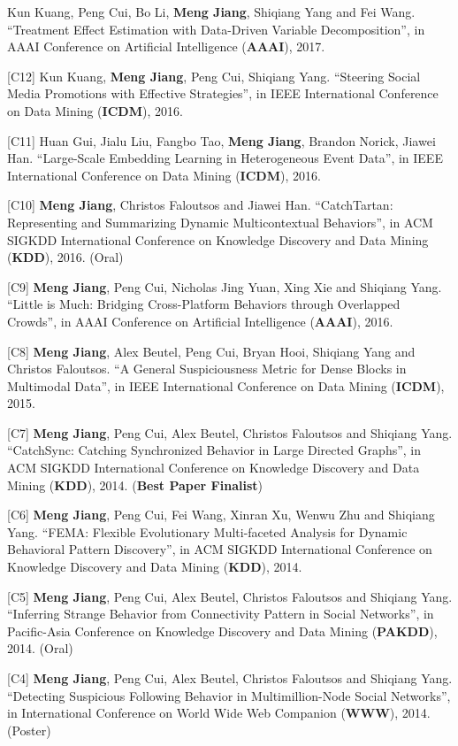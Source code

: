 \documentclass[margin, 9pt]{res}
\begin{document}
\begin{resume}
[C13] Kun Kuang, Peng Cui, Bo Li, \textbf{Meng Jiang}, Shiqiang Yang and Fei Wang. ``Treatment Effect Estimation with Data-Driven Variable Decomposition'', in AAAI Conference on Artificial Intelligence (\textbf{AAAI}), 2017.

[C12] Kun Kuang, \textbf{Meng Jiang}, Peng Cui, Shiqiang Yang. ``Steering Social Media Promotions with Effective Strategies'', in IEEE International Conference on Data Mining (\textbf{ICDM}), 2016.

[C11] Huan Gui, Jialu Liu, Fangbo Tao, \textbf{Meng Jiang}, Brandon Norick, Jiawei Han. ``Large-Scale Embedding Learning in Heterogeneous Event Data'', in IEEE International Conference on Data Mining (\textbf{ICDM}), 2016.

[C10] \textbf{Meng Jiang}, Christos Faloutsos and Jiawei Han. ``CatchTartan: Representing and Summarizing Dynamic Multicontextual Behaviors'', in ACM SIGKDD International Conference on Knowledge Discovery and Data Mining (\textbf{KDD}), 2016. (Oral)

[C9] \textbf{Meng Jiang}, Peng Cui, Nicholas Jing Yuan, Xing Xie and Shiqiang Yang. ``Little is Much: Bridging Cross-Platform Behaviors through Overlapped Crowds'', in AAAI Conference on Artificial Intelligence (\textbf{AAAI}), 2016.

[C8] \textbf{Meng Jiang}, Alex Beutel, Peng Cui, Bryan Hooi, Shiqiang Yang and Christos Faloutsos. ``A General Suspiciousness Metric for Dense Blocks in Multimodal Data'', in IEEE International Conference on Data Mining (\textbf{ICDM}), 2015.

[C7] \textbf{Meng Jiang}, Peng Cui, Alex Beutel, Christos Faloutsos and Shiqiang Yang. ``CatchSync: Catching Synchronized Behavior in Large Directed Graphs'', in ACM SIGKDD International Conference on Knowledge Discovery and Data Mining (\textbf{KDD}), 2014. (\textbf{Best Paper Finalist})

[C6] \textbf{Meng Jiang}, Peng Cui, Fei Wang, Xinran Xu, Wenwu Zhu and Shiqiang Yang. ``FEMA: Flexible Evolutionary Multi-faceted Analysis for Dynamic Behavioral Pattern Discovery'', in ACM SIGKDD International Conference on Knowledge Discovery and Data Mining (\textbf{KDD}), 2014.

[C5] \textbf{Meng Jiang}, Peng Cui, Alex Beutel, Christos Faloutsos and Shiqiang Yang. ``Inferring Strange Behavior from Connectivity Pattern in Social Networks'', in Pacific-Asia Conference on Knowledge Discovery and Data Mining (\textbf{PAKDD}), 2014. (Oral)

[C4] \textbf{Meng Jiang}, Peng Cui, Alex Beutel, Christos Faloutsos and Shiqiang Yang. ``Detecting Suspicious Following Behavior in Multimillion-Node Social Networks'', in International Conference on World Wide Web Companion (\textbf{WWW}), 2014. (Poster)


\end{resume}
\end{document}
